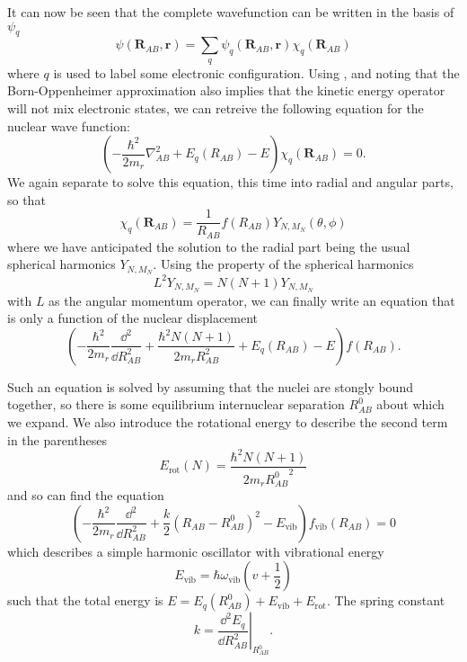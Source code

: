 It can now be seen that the complete wavefunction can be written in the basis
of $\psi_q$
%
\begin{equation}
  \psi(\mathbf{R}_{AB}, \mathbf{r}) = \sum_q \psi_q(\mathbf{R}_{AB},
  \mathbf{r}) \chi_q(\mathbf{R}_{AB})
\end{equation}
%
where $q$ is used to label some electronic configuration.
%
Using , and noting that the Born-Oppenheimer
approximation also implies that the kinetic energy operator will not mix
electronic states, we can retreive the following equation for the nuclear wave
function:
%
\begin{equation}
  \left(-\frac{\hbar^2}{2m_r}\nabla_{AB}^2 + E_q(R_{AB}) -
  E\right)\chi_q(\mathbf{R}_{AB}) = 0.
\end{equation}
%
We again separate to solve this equation, this time into radial and angular
parts, so that
%
\begin{equation}
  \chi_q(\mathbf{R}_{AB}) = \frac{1}{R_{AB}}f(R_{AB})Y_{N,M_N}(\theta, \phi)
\end{equation}
%
where we have anticipated the solution to the radial part being the usual
spherical harmonics $Y_{N, M_N}$. Using the property of the spherical harmonics
%
\begin{equation}
  L^2 Y_{N, M_N} = N(N+1)Y_{N, M_N}
\end{equation}
%
with $L$ as the angular momentum operator, we can finally write an equation
that is only a function of the nuclear displacement
%
\begin{equation}
  \left(-\frac{\hbar^2}{2m_r}\frac{\dd^2}{\dd R_{AB}^2} +
    \frac{\hbar^2 N(N+1)}{2m_rR_{AB}^2} + E_q(R_{AB}) - E\right)f(R_{AB}).
\end{equation}

Such an equation is solved by assuming that the nuclei are stongly bound
together, so there is some equilibrium internuclear separation $R^0_{AB}$ about
which we expand. We also introduce the rotational energy to describe the
second term in the parentheses
%
\begin{equation}
  E_\text{rot}(N) = \frac{\hbar^2 N(N+1)}{2 m_r {R^0_{AB}}^2}
  \label{theory:eqn:rotenergy}
\end{equation}
%
and so can find the equation
%
\begin{equation}
  \left(-\frac{\hbar^2}{2m_r} \frac{\dd^2}{\dd R_{AB}^2} + \frac{k}{2}(R_{AB} -
    R^0_{AB})^2 - E_\text{vib}\right)f_\text{vib}(R_{AB})=0
\end{equation}
%
which describes a simple harmonic oscillator with vibrational energy
%
\begin{equation}
  E_\text{vib} = \hbar\omega_\text{vib}\left(v + \frac{1}{2}\right)
\end{equation}
%
such that the total energy is $E = E_q(R_{AB}^0) + E_\text{vib} +
E_\text{rot}$. The spring constant
%
\begin{equation}
  k = \left.\frac{\dd^2 E_q}{\dd R_{AB}^2}\right\rvert_{R_{AB}^0}.
\end{equation}

